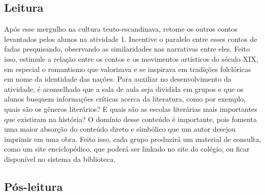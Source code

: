 \documentclass[12pt]{extarticle}
\begin{document}









\subsection{Leitura}


Após esse mergulho na cultura teuto-escandinava, retome os
outros contos levantados pelos alunos na atividade 1. Incentive o
paralelo entre esses contos de fadas pesquisando, observando as
similaridades nas narrativas entre eles. Feito isso, estimule a relação
entre os contos e os movimentos artísticos do século XIX, em especial o
romantismo que valorizava e se inspirava em tradições folclóricas em
nome da identidade das nações. Para auxiliar no desenvolvimento da
atividade, é aconselhado que a sala de aula seja dividida em grupos e
que os alunos busquem informações críticas acerca da literatura, como
por exemplo, quais são os gêneros literários? E quais são as escolas
literárias mais importantes que existiram na história? O domínio desse
conteúdo é importante, pois fomenta uma maior absorção do conteúdo
direto e simbólico que um autor desejou imprimir em uma obra. Feito
isso, cada grupo produzirá um material de consulta, como um site
enciclopédico, que poderá ser linkado no site do colégio, ou ficar
disponível no sistema da biblioteca.

\subsection{Pós-leitura}

\end{document}
